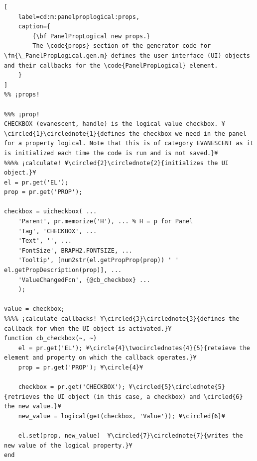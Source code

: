 \documentclass{tufte-handout}
\begin{document}
\begin{lstlisting}[
	label=cd:m:panelproplogical:props,
	caption={
		{\bf PanelPropLogical new props.}
		The \code{props} section of the generator code for \fn{\_PanelPropLogical.gen.m} defines the user interface (UI) objects and their callbacks for the \code{PanelPropLogical} element.
	}
]
%% ¡props!

%%% ¡prop!
CHECKBOX (evanescent, handle) is the logical value checkbox. ¥\circled{1}\circlednote{1}{defines the checkbox we need in the panel for a property logical. Note that this is of category EVANESCENT as it is initialized each time the code is run and is not saved.}¥
%%%% ¡calculate! ¥\circled{2}\circlednote{2}{initializes the UI object.}¥
el = pr.get('EL');
prop = pr.get('PROP');

checkbox = uicheckbox( ...
	'Parent', pr.memorize('H'), ... % H = p for Panel
	'Tag', 'CHECKBOX', ...
	'Text', '', ...
	'FontSize', BRAPH2.FONTSIZE, ...
	'Tooltip', [num2str(el.getPropProp(prop)) ' ' el.getPropDescription(prop)], ...
	'ValueChangedFcn', {@cb_checkbox} ...
	);

value = checkbox;
%%%% ¡calculate_callbacks! ¥\circled{3}\circlednote{3}{defines the callback for when the UI object is activated.}¥
function cb_checkbox(~, ~)
	el = pr.get('EL'); ¥\circle{4}\twocirclednotes{4}{5}{reteieve the element and property on which the callback operates.}¥
	prop = pr.get('PROP'); ¥\circle{4}¥

	checkbox = pr.get('CHECKBOX'); ¥\circled{5}\circlednote{5}{retrieves the UI object (in this case, a checkbox) and \circled{6} the new value.}¥
	new_value = logical(get(checkbox, 'Value')); ¥\circled{6}¥

	el.set(prop, new_value)  ¥\circled{7}\circlednote{7}{writes the new value of the logical property.}¥
end
\end{lstlisting}
\end{document}

